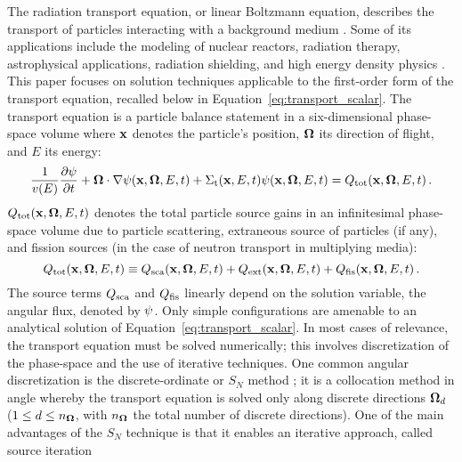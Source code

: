 The radiation transport equation, or linear Boltzmann equation, describes the
transport of particles interacting with a background medium \cite{glasstone}.  Some
of its applications include the modeling of nuclear reactors, radiation
therapy, astrophysical applications, radiation shielding, and high energy density physics
\cite{glasstone,radiotherapy,astrophysics_textbook,lewis,laser_plasmas}.
This paper focuses on solution techniques applicable to the first-order
form of the transport equation, recalled below in Equation~\eqref{eq:transport_scalar}. The
transport equation is a particle balance statement in a six-dimensional phase-space volume
where $\mathbf{x}$ denotes the particle's position, $\mathbf{\Omega}$ its direction of flight, and $E$ its energy:
\begin{equation}\label{eq:transport_scalar}
  \frac{1}{v(E)}\frac{\partial \psi}{\partial t} + \mathbf{\Omega}\cdot\nabla\psi(\mathbf{x},\mathbf{\Omega},E,t)
    + \Sigma_\textup{t}(\mathbf{x},E,t)\psi(\mathbf{x},\mathbf{\Omega},E,t) = Q_\textup{tot}(\mathbf{x},\mathbf{\Omega},E,t)
  \,.
\end{equation}
$Q_\textup{tot}(\mathbf{x},\mathbf{\Omega},E,t)$ denotes the total particle source gains in an infinitesimal phase-space volume
due to particle scattering, extraneous source of particles (if any), and
fission sources (in the case of neutron transport in multiplying media):
\begin{equation}
  Q_\textup{tot}(\mathbf{x},\mathbf{\Omega},E,t) \equiv Q_\textup{sca}(\mathbf{x},\mathbf{\Omega},E,t) + Q_\textup{ext}(\mathbf{x},\mathbf{\Omega},E,t) + Q_\textup{fis}(\mathbf{x},\mathbf{\Omega},E,t)
  \,.
\end{equation}
The source terms $Q_\textup{sca}$ and $Q_\textup{fis}$ linearly depend on the solution variable, the angular flux, denoted by $\psi$. Only simple configurations are amenable to an analytical solution of Equation~\eqref{eq:transport_scalar}.
In most cases of relevance, the transport equation must be solved numerically; this involves discretization
of the phase-space and the use of iterative techniques.
One common angular discretization is the discrete-ordinate or $S_N$ method
\cite{glasstone,lewis,duderstadt}; it is a collocation method in angle whereby the transport equation is solved only along discrete directions $\mathbf{\Omega}_d$
($1 \le d \le n_{\mathbf{\Omega}}$, with $n_{\mathbf{\Omega}}$ the total number of discrete directions). One of the
main advantages of the $S_N$ technique is that it enables an iterative approach, called source iteration
